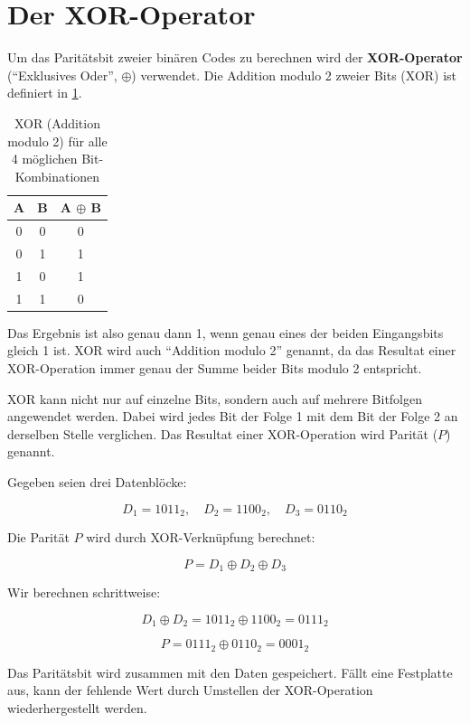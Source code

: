\section{Der XOR-Operator}

Um das Paritätsbit zweier binären Codes zu berechnen wird der \textbf{XOR-Operator} (\enquote{Exklusives Oder}, $\oplus$) verwendet. Die Addition modulo 2 zweier Bits (XOR) ist definiert in \cref{tab:mod2}.

\begin{table}[H]
\centering
\begin{tabular}{c|c||c}
A & B & A $\oplus$ B \\\midrule\midrule
0 & 0 & 0 \\\midrule
0 & 1 & 1 \\\midrule
1 & 0 & 1 \\\midrule
1 & 1 & 0 \\
\end{tabular}
\caption{XOR (Addition modulo 2) für alle 4 möglichen Bit-Kombinationen}
\label{tab:mod2}
\end{table}

Das Ergebnis ist also genau dann 1, wenn genau eines der beiden Eingangsbits gleich 1 ist. XOR wird auch \enquote{Addition modulo 2} genannt, da das Resultat einer XOR-Operation immer genau der Summe beider Bits modulo 2 entspricht.

XOR kann nicht nur auf einzelne Bits, sondern auch auf mehrere Bitfolgen angewendet werden. Dabei wird jedes Bit der Folge 1 mit dem Bit der Folge 2 an derselben Stelle verglichen. Das Resultat einer XOR-Operation wird Parität ($P$) genannt.


\begin{myexample}
Gegeben seien drei Datenblöcke:

\[
D_1 = 1011_2, \quad D_2 = 1100_2, \quad D_3 = 0110_2
\]

Die Parität \( P \) wird durch XOR-Verknüpfung berechnet:

\[
P = D_1 \oplus D_2 \oplus D_3
\]

Wir berechnen schrittweise:

\[
D_1 \oplus D_2 = 1011_2 \oplus 1100_2 = 0111_2
\]

\[
P = 0111_2 \oplus 0110_2 = 0001_2
\]

Das Paritätsbit wird zusammen mit den Daten gespeichert. Fällt eine Festplatte aus, kann der fehlende Wert durch Umstellen der XOR-Operation wiederhergestellt werden.
\end{myexample}


